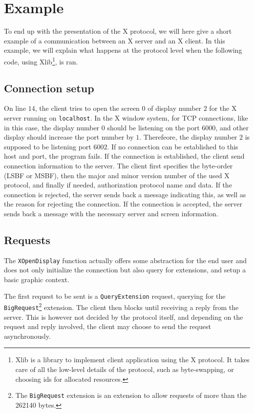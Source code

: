 \section{Example}
To end up with the presentation of the X protocol, we will here give a
short example of a communication between an X server and an X client. 
In this example, we will explain what happens at the protocol level 
when the following code, using Xlib\footnote{Xlib is a library to implement client
application using the X protocol. It takes care of all the low-level details of the 
protocol, such as byte-swapping, or choosing ids for allocated resources.}, is ran.
%

%
\subsection{Connection setup}
On line $14$, the client tries to open the screen $0$ of display number $2$
for the X server running on \lstinline{localhost}. In the X window system, for TCP connections,
like in this case, the display number $0$ should be listening on the port $6000$, and 
other display should increase the port number by $1$. Therefeore, the display number $2$ is 
supposed to be listening port $6002$. If no connection can be established to this host and port, 
the program fails. If the connection is established, the client send connection information to 
the server. The client first specifies the byte-order (LSBF or MSBF), then the major and 
minor version number of the used X protocol, and finally if needed, authorization protocol 
name and data.
%
If the connection is rejected, the server sends back a message indicating this, as well 
as the reason for rejecting the connection.
%
If the connection is accepted, the server sends back a message with the necessary server and 
screen information.
%
\subsection{Requests}
The \lstinline{XOpenDisplay} function actually offers some abstraction for the end user and
does not only initialize the connection but also query for extensions, and setup a basic 
graphic context. 

The first request to be sent is a \lstinline{QueryExtension} request, querying for the 
\lstinline{BigRequest}\footnote{The \lstinline{BigRequest} extension is 
  an extension to allow requests of more than the 262140 bytes.} extension. The client then blocks 
until receiving a reply from the server. This is however not decided by the protocol itself, 
and depending on the request and reply involved, the client may choose to send the request 
asynchronously.

